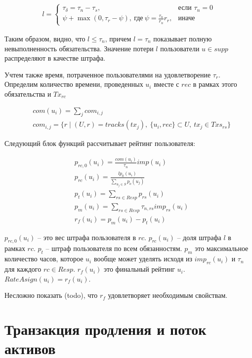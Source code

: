 \documentclass[specification,annotation]{itmo-student-thesis}
\begin{document}
\begin{align*}
l =
\begin{cases}
  \tau_{\delta} = \tau_n - \tau_s, & \text{если } \tau_n = 0 \\
  \psi + \max{(0, \tau_r - \psi)}, \ \text{где} \ \psi = \frac{\tau_n}{r_n}r_r, & \text{иначе}
\end{cases}
\end{align*}

Таким образом, видно, что $l \leq \tau_n$, причем $l = \tau_n$
показывает полную невыполненность обязательства. Значение потери $l$
пользователи $u \in supp$ распределяют в качестве штрафа.

Учтем также время, потраченное пользователями на удовлетворение
$\tau_r$. Определим количество времени, проведенных $u_i$ вместе с
$rec$ в рамках этого обязательства и $Tx_{rc}$

\begin{align*}
  &com(u_i) = \sum_j{com_{i,j}} \\
  &com_{i,j} = \{r \mid (U,r) = tracks(tx_j),\ \{u_i, rec\} \subset U, \ tx_j \in Txs_{rs}\}
\end{align*}

Следующий блок функций рассчитывает рейтинг пользователя:

\begin{align*}
  &p_{rc,0}(u_i) = \frac{com(u_i)}{\tau_n}imp(u_i) \\
  &p_{rc}(u_i) = \frac{l p_0(u_i)}{\sum_{u_j \in S}{p_o(u_j)}} \\
  &p_t(u_i) = \sum_{rs \in Resp}{p_{rs}(u_i)} \\
  &p_m(u_i) = \sum_{rs \in Resp}{\tau_{n,rs} imp_{rs}(u_i)} \\
  &r_f(u_i) = p_m(u_i) - p_t(u_i)
\end{align*}

$p_{rc,0}(u_i)$ -- это вес штрафа пользователя в $rc$. $p_{rc}(u_i)$
-- доля штрафа $l$ в рамках $rc$. $p_t$ -- штраф пользователя по всем
обязанностям. $p_m$ это максимальное количество часов, которое $u_i$
вообще может уделять исходя из $imp_{rc}(u_i)$ и $\tau_n$ для каждого
$rc \in Resp$. $r_f(u_i)$ это финальный рейтинг $u_i$. $RateAsign(u_i)
= r_f(u_i)$.

Несложно показать (todo), что $r_f$ удовлетворяет необходимым свойствам.

\section{Транзакция продления и поток активов}
\end{document}

